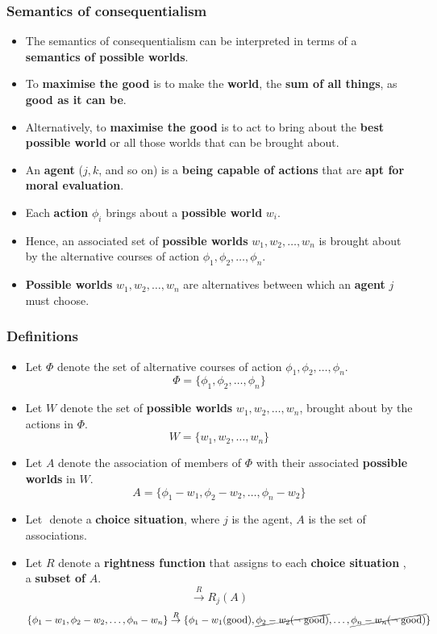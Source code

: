 \documentclass[11pt]{article}
\begin{document}
\subsubsection{Semantics of consequentialism}
\label{sec:orgfdc604c}
\begin{itemize}
\item The semantics of consequentialism can be interpreted in terms of a \textbf{semantics of possible worlds}.
\item To \textbf{maximise the good} is to make the \textbf{world}, the \textbf{sum of all things}, as \textbf{good as it can be}.
\item Alternatively, to \textbf{maximise the good} is to act to bring about the \textbf{best possible world} or all those worlds that can be brought about.
\item An \textbf{agent} (\(j, k\), and so on) is a \textbf{being capable of actions} that are \textbf{apt for moral evaluation}.
\item Each \textbf{action} \(\phi_i\) brings about a \textbf{possible world} \(w_i\).
\item Hence, an associated set of \textbf{possible worlds} \(w_1, w_2, \ldots, w_n\) is brought about by the alternative courses of action \(\phi_1, \phi_2, \ldots, \phi_n\).
\item \textbf{Possible worlds} \(w_1, w_2, \ldots, w_n\) are alternatives between which an \textbf{agent} \(j\) must choose.
\end{itemize}
\subsubsection{Definitions}
\label{sec:org60df9d8}
\begin{itemize}
\item Let \(\Phi\) denote the set of alternative courses of action \(\phi_1, \phi_2, \ldots, \phi_n\).
\[\Phi = \{\phi_1, \phi_2, \ldots, \phi_n\}\]
\item Let \(W\) denote the set of \textbf{possible worlds} \(w_1, w_2, \ldots, w_n\), brought about by the actions in \(\Phi\).
\[W = \{w_1, w_2, \ldots, w_n\}\]
\item Let \(A\) denote the association of members of \(\Phi\) with their associated \textbf{possible worlds} in \(W\).
\[A = \{\phi_1 - w_1, \phi_2 - w_2, \ldots, \phi_n - w_2\}\]
\item Let \(<j, A>\) denote a \textbf{choice situation}, where \(j\) is the agent, \(A\) is the set of associations.
\item Let \(R\) denote a \textbf{rightness function} that assigns to each \textbf{choice situation} \(<j, A>\), a \textbf{subset of} \(A\).
\[<j, A> \overset{R}{\rightarrow} R_j (A)\]
\[\{\phi_1 - w_1, \phi_2 - w_2, \ldots, \phi_n - w_n\} \overset{R}{\rightarrow} \{\phi_1 - w_1 (\text{good}), \cancel{\phi_2 - w_2 (\neg \text{ good})}, \ldots, \cancel{\phi_n - w_n (\neg \text{ good})}\}\]
\end{itemize}
\end{document}
